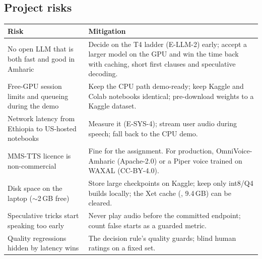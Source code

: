 \subsection{Project risks}
\begin{center}\small
\begin{tabularx}{\textwidth}{@{}L{4.2cm}Y@{}}
\toprule
\textbf{Risk} & \textbf{Mitigation} \\
\midrule
No open LLM that is both fast and good in Amharic & Decide on the T4 ladder (E-LLM-2) early; accept a larger model on the GPU and win the time back with caching, short first clauses and speculative decoding. \\
Free-GPU session limits and queueing during the demo & Keep the CPU path demo-ready; keep Kaggle and Colab notebooks identical; pre-download weights to a Kaggle dataset. \\
Network latency from Ethiopia to US-hosted notebooks & Measure it (E-SYS-4); stream user audio during speech; fall back to the CPU demo. \\
MMS-TTS licence is non-commercial & Fine for the assignment. For production, OmniVoice-Amharic (Apache-2.0) or a Piper voice trained on WAXAL (CC-BY-4.0). \\
Disk space on the laptop ($\sim$2\,GB free) & Store large checkpoints on Kaggle; keep only int8/Q4 builds locally; the Xet cache (, 9.4\,GB) can be cleared. \\
Speculative tricks start speaking too early & Never play audio before the committed endpoint; count false starts as a guarded metric. \\
Quality regressions hidden by latency wins & The decision rule's quality guards; blind human ratings on a fixed set. \\
\bottomrule
\end{tabularx}
\end{center}
